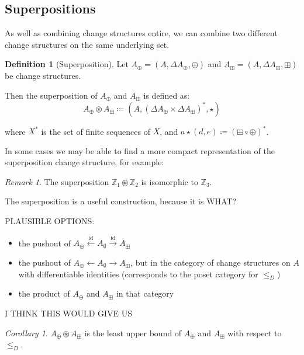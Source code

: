 \documentclass[english]{article}
\theoremstyle{plain}
\theoremstyle{definition}
\theoremstyle{remark}
\theoremstyle{remark}
\newtheorem{corollary}[thm]{Corollary}
\theoremstyle{remark}
\newtheorem{rem}[thm]{Remark}
\theoremstyle{definition}
\newtheorem{defn}{Definition}
\newcommand{\defeq}{\coloneqq}
\newcommand{\cplus}{\oplus}
\newcommand{\cpluss}{\boxplus}
\newcommand{\cstruct}[3]{(#1,#2,#3)}
\newcommand{\changes}[1]{\Delta #1}
\newcommand{\discrete}{\emptyset}
\newcommand{\superpose}{\circledast}
\newcommand{\fineOrder}{\leq_D}
\begin{document}
\subsection{Superpositions}

As well as combining change structures entire, we can combine two different
change structures on the same underlying set.

\begin{defn}[Superposition]
  Let $A_\cplus = \cstruct{A}{\changes{A}_\cplus}{\cplus}$ and $A_\cpluss =
  \cstruct{A}{\changes{A}_\cpluss}{\cpluss}$ be change structures.

  Then the superposition of $A_\cplus$ and $A_\cpluss$ is defined as:
  $$A_\cplus \superpose A_\cpluss \defeq \cstruct{A}{
    (\changes{A}_\cplus \times \changes{A}_\cpluss)^\ast}{\star}$$

  where $X^\ast$ is the set of finite sequences of $X$, and $a \star (d, e)
  \defeq (\cpluss \circ \cplus)^\ast$.
\end{defn}

In some cases we may be able to find a more compact representation of the
superposition change structure, for example:

\begin{rem}
  The superposition $\mathbb{Z}_1 \superpose \mathbb{Z}_2$ is isomorphic to $\mathbb{Z}_3$.
\end{rem}

The superposition is a useful construction, because it is WHAT?

PLAUSIBLE OPTIONS:
\begin{itemize}
  \item the pushout of $A_\cplus \xleftarrow{\text{id}} A_\discrete \xrightarrow{\text{id}} A_\cpluss$
  \item the pushout of $A_\cplus \leftarrow A_\discrete
    \rightarrow A_\cpluss$, but in the category of change structures on $A$ with
    differentiable identities (corresponds to the poset category for $\fineOrder$)
  \item the product of $A_\cplus$ and $A_\cpluss$ in that category
\end{itemize}

I THINK THIS WOULD GIVE US

\begin{corollary}
  $A_\cplus \superpose A_\cpluss$ is the least upper bound of $A_\cplus$ and
  $A_\cpluss$ with respect to $\fineOrder$.
\end{corollary}
\end{document}
